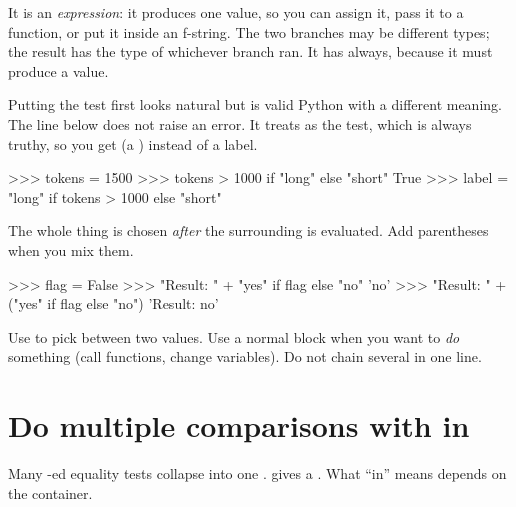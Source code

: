 \begin{typecheck}
It is an \emph{expression}: it produces one value, so you can assign it, pass it to a function, or put
it inside an f-string. The two branches may be different types; the result has the type of whichever
branch ran. It has  always, because it must produce a value.
\end{typecheck}

\begin{trap}
Putting the test first looks natural but is valid Python with a different meaning. The line below does not
raise an error. It treats  as the test, which is always truthy, so you get
 (a ) instead of a label.
\end{trap}

\begin{pycode}
>>> tokens = 1500
>>> tokens > 1000 if "long" else "short"
True
>>> label = "long" if tokens > 1000 else "short"
\end{pycode}

\begin{trap}
The whole thing is chosen \emph{after} the surrounding \code{+} is evaluated. Add parentheses when you mix
them.
\end{trap}

\begin{pycode}
>>> flag = False
>>> "Result: " + "yes" if flag else "no"
'no'
>>> "Result: " + ("yes" if flag else "no")
'Result: no'
\end{pycode}

\begin{gamerule}
Use  to pick between two values. Use a normal  block when you want to
\emph{do} something (call functions, change variables). Do not chain several in one line.
\end{gamerule}

\section{Do multiple comparisons with in}

Many -ed equality tests collapse into one .  gives a .
What ``in'' means depends on the container.

